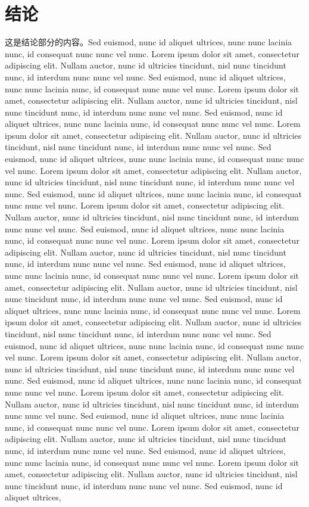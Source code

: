 \documentclass[nodate,openany]{conveyoptions}
\begin{document}
\chapter{结论}
这是结论部分的内容。Sed euismod, nunc id aliquet ultrices, nunc nunc lacinia nunc, id consequat nunc nunc vel nunc. Lorem ipsum dolor sit amet, consectetur adipiscing elit. Nullam auctor, nunc id ultricies tincidunt, nisl nunc tincidunt nunc, id interdum nunc nunc vel nunc. Sed euismod, nunc id aliquet ultrices, nunc nunc lacinia nunc, id consequat nunc nunc vel nunc. Lorem ipsum dolor sit amet, consectetur adipiscing elit. Nullam auctor, nunc id ultricies tincidunt, nisl nunc tincidunt nunc, id interdum nunc nunc vel nunc. Sed euismod, nunc id aliquet ultrices, nunc nunc lacinia nunc, id consequat nunc nunc vel nunc. Lorem ipsum dolor sit amet, consectetur adipiscing elit. Nullam auctor, nunc id ultricies tincidunt, nisl nunc tincidunt nunc, id interdum nunc nunc vel nunc. Sed euismod, nunc id aliquet ultrices, nunc nunc lacinia nunc, id consequat nunc nunc vel nunc. Lorem ipsum dolor sit amet, consectetur adipiscing elit. Nullam auctor, nunc id ultricies tincidunt, nisl nunc tincidunt nunc, id interdum nunc nunc vel nunc. Sed euismod, nunc id aliquet ultrices, nunc nunc lacinia nunc, id consequat nunc nunc vel nunc. Lorem ipsum dolor sit amet, consectetur adipiscing elit. Nullam auctor, nunc id ultricies tincidunt, nisl nunc tincidunt nunc, id interdum nunc nunc vel nunc. Sed euismod, nunc id aliquet ultrices, nunc nunc lacinia nunc, id consequat nunc nunc vel nunc. Lorem ipsum dolor sit amet, consectetur adipiscing elit. Nullam auctor, nunc id ultricies tincidunt, nisl nunc tincidunt nunc, id interdum nunc nunc vel nunc. Sed euismod, nunc id aliquet ultrices, nunc nunc lacinia nunc, id consequat nunc nunc vel nunc. Lorem ipsum dolor sit amet, consectetur adipiscing elit. Nullam auctor, nunc id ultricies tincidunt, nisl nunc tincidunt nunc, id interdum nunc nunc vel nunc. Sed euismod, nunc id aliquet ultrices, nunc nunc lacinia nunc, id consequat nunc nunc vel nunc. Lorem ipsum dolor sit amet, consectetur adipiscing elit. Nullam auctor, nunc id ultricies tincidunt, nisl nunc tincidunt nunc, id interdum nunc nunc vel nunc. Sed euismod, nunc id aliquet ultrices, nunc nunc lacinia nunc, id consequat nunc nunc vel nunc. Lorem ipsum dolor sit amet, consectetur adipiscing elit. Nullam auctor, nunc id ultricies tincidunt, nisl nunc tincidunt nunc, id interdum nunc nunc vel nunc. Sed euismod, nunc id aliquet ultrices, nunc nunc lacinia nunc, id consequat nunc nunc vel nunc. Lorem ipsum dolor sit amet, consectetur adipiscing elit. Nullam auctor, nunc id ultricies tincidunt, nisl nunc tincidunt nunc, id interdum nunc nunc vel nunc. Sed euismod, nunc id aliquet ultrices, nunc nunc lacinia nunc, id consequat nunc nunc vel nunc. Lorem ipsum dolor sit amet, consectetur adipiscing elit. Nullam auctor, nunc id ultricies tincidunt, nisl nunc tincidunt nunc, id interdum nunc nunc vel nunc. Sed euismod, nunc id aliquet ultrices, nunc nunc lacinia nunc, id consequat nunc nunc vel nunc. Lorem ipsum dolor sit amet, consectetur adipiscing elit. Nullam auctor, nunc id ultricies tincidunt, nisl nunc tincidunt nunc, id interdum nunc nunc vel nunc. Sed euismod, nunc id aliquet ultrices, 
\end{document}
